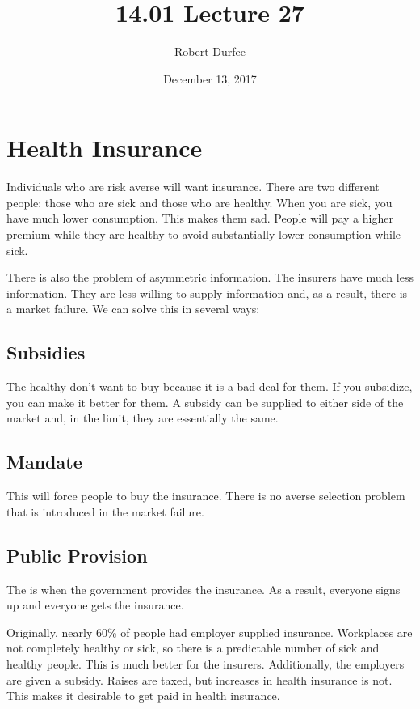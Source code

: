 \documentclass{article}
\title{ 14.01 Lecture 27 }
\author{ Robert Durfee }
\date{ December 13, 2017 }
\begin{document}
\maketitle

\section{ Health Insurance }

Individuals who are risk averse will want insurance. There are two different
people: those who are sick and those who are healthy. When you are sick, you
have much lower consumption. This makes them sad. People will pay a higher
premium while they are healthy to avoid substantially lower consumption while
sick.

There is also the problem of asymmetric information. The insurers have much less
information. They are less willing to supply information and, as a result, there
is a market failure. We can solve this in several ways:

\subsection{Subsidies}

The healthy don't want to buy because it is a bad deal for them. If you
subsidize, you can make it better for them. A subsidy can be supplied to either
side of the market and, in the limit, they are essentially the same.

\subsection{Mandate}

This will force people to buy the insurance. There is no averse selection
problem that is introduced in the market failure.

\subsection{Public Provision}

The is when the government provides the insurance. As a result, everyone signs
up and everyone gets the insurance.

\bigbreak

Originally, nearly 60\% of people had employer supplied insurance. Workplaces
are not completely healthy or sick, so there is a predictable number of sick and
healthy people. This is much better for the insurers. Additionally, the
employers are given a subsidy. Raises are taxed, but increases in health
insurance is not. This makes it desirable to get paid in health insurance.
\end{document}
